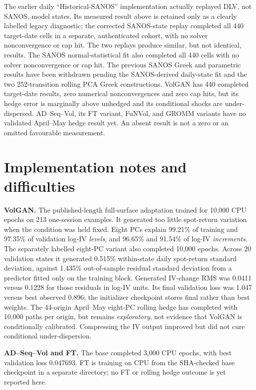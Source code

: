 \documentclass[10pt]{article}
\begin{document}
The earlier daily ``Historical-SANOS'' implementation actually replayed DLV,
not SANOS, model states. Its measured result above is retained only as a
clearly labelled legacy diagnostic; the corrected SANOS-state replay completed
all 440 target-date cells in a separate, authenticated cohort, with no solver
nonconvergence or cap hit. The two replays produce similar, but not identical,
results. The SANOS normal-statistical fit also completed all 440 cells with no
solver nonconvergence or cap hit. The previous SANOS Greek and parametric
results have been withdrawn pending the SANOS-derived daily-state fit and
the two 252-transition rolling PCA Greek constructions. VolGAN has 440 completed target-date results, zero
numerical nonconvergences and zero cap hits, but its hedge error is marginally
above unhedged and its conditional shocks are under-dispersed. AD--Seq--Vol,
its FT variant, FuNVol, and GROMM variants have no validated
April--May hedge result yet. An absent result is not a zero or an omitted
favourable measurement.

\section{Implementation notes and difficulties}

\textbf{VolGAN.} The published-length full-surface adaptation trained for
10,000 CPU epochs on 213 one-session examples. It generated too little
spot-return variation when the condition was held fixed. Eight PCs explain
99.21\% of training and 97.35\% of validation log-IV \emph{levels}, and 96.65\%
and 91.54\% of log-IV \emph{increments}. The separately labelled eight-PC
variant also completed 10,000 epochs. Across 20 validation states it generated
0.515\% within-state daily spot-return standard deviation, against 1.435\%
out-of-sample residual standard deviation from a predictor fitted only on the
training block. Generated IV-change RMS was 0.0411 versus 0.1228 for those
residuals in log-IV units. Its final validation loss was 1.047 versus best
observed 0.896; the initializer checkpoint stores final rather than best
weights. The 44-origin April--May eight-PC rolling hedge has completed with
10,000 paths per origin, but remains \emph{exploratory}, not evidence that
VolGAN is conditionally calibrated. Compressing the IV output improved but did
not cure conditional under-dispersion.

\textbf{AD--Seq--Vol and FT.} The base completed 3,000 CPU epochs, with best
validation loss 0.047693. FT is training on CPU from the SHA-checked base checkpoint in a
separate directory; no FT or rolling hedge outcome is yet reported here.
\end{document}
